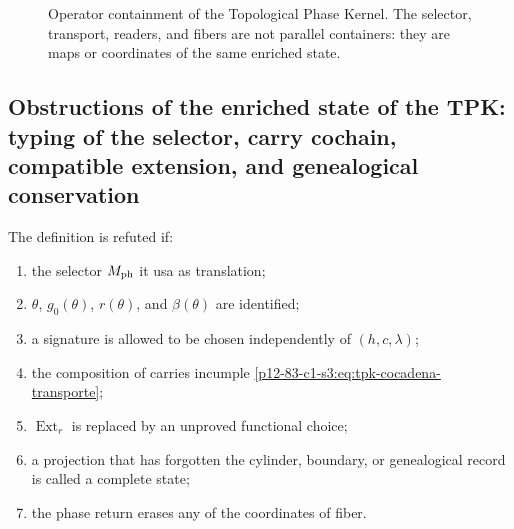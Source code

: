 {\begin{figure}[htbp]
 \centering
 \caption{Operator containment of the Topological Phase Kernel. The selector,
 transport, readers, and fibers are not parallel containers: they are
 maps or coordinates of the same enriched state.}
 \label{p12-83-c1-s3:fig:tpk-arbol-operatorio-autonomo}
\end{figure}

\subsection{Obstructions of the enriched state of the TPK: typing of the selector, carry cochain, compatible extension, and genealogical conservation}

\begin{criterion}
The definition is refuted if:
\begin{enumerate}
 \item the selector \(M_{\rm ph}\) it usa as translation;
 \item \(\theta\), \(g_0(\theta)\), \(r(\theta)\), and
       \(\beta(\theta)\) are identified;
 \item a signature is allowed to be chosen independently of
       \((h,c,\lambda)\);
 \item the composition of carries incumple
       \cref{p12-83-c1-s3:eq:tpk-cocadena-transporte};
 \item \(\operatorname{Ext}_r\) is replaced by an unproved functional choice;
 \item a projection that has forgotten the cylinder, boundary,
       or genealogical record is called a complete state;
 \item the phase return erases any of the coordinates of fiber.
\end{enumerate}
\end{criterion}

}
